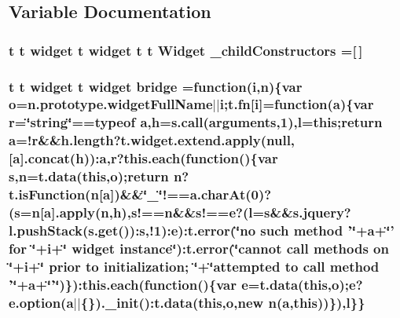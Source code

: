 \subsection{Variable Documentation}
\hypertarget{root_2static_2root_2js_2bootstrap_2jquery-ui-1_810_84_8custom_8min_8js_a82e9fe96f4c63a640d414c9ea1d4fc32}{
\subsubsection[{\-\_\-child\-Constructors}]{ {\bf t} {\bf t} {\bf widget} {\bf t} {\bf widget} {\bf t} {\bf t} {\bf Widget} \-\_\-child\-Constructors =\mbox{[}$\,$\mbox{]}}}\label{root_2static_2root_2js_2bootstrap_2jquery-ui-1_810_84_8custom_8min_8js_a82e9fe96f4c63a640d414c9ea1d4fc32}
\hypertarget{root_2static_2root_2js_2bootstrap_2jquery-ui-1_810_84_8custom_8min_8js_a937dfd5a26af72e715911d045dbd0f69}{
\subsubsection[{bridge}]{ {\bf t} {\bf t} {\bf widget} {\bf t} {\bf widget} bridge =function({\bf i},{\bf n})\{var {\bf o}=n.\-prototype.\-widget\-Full\-Name$\vert$$\vert${\bf i};{\bf t.\-fn}\mbox{[}{\bf i}\mbox{]}=function({\bf a})\{var {\bf r}=\char`\"{}string\char`\"{}==typeof {\bf a},{\bf h}={\bf s.\-call}(arguments,1),{\bf l}=this;return {\bf a}=!{\bf r}\&\&h.\-length?t.\-widget.\-extend.\-apply(null,\mbox{[}{\bf a}\mbox{]}.concat({\bf h}))\-:{\bf a},{\bf r}?{\bf this.\-each}(function()\{var {\bf s},{\bf n}={\bf t.\-data}(this,{\bf o});return {\bf n}?t.\-is\-Function({\bf n}\mbox{[}{\bf a}\mbox{]})\&\&\char`\"{}\-\_\-\char`\"{}!==a.\-char\-At(0)?({\bf s}={\bf n}\mbox{[}{\bf a}\mbox{]}.apply({\bf n},{\bf h}),s!=={\bf n}\&\&s!=={\bf e}?({\bf l}={\bf s}\&\&s.\-jquery?l.\-push\-Stack(s.\-get())\-:{\bf s},!1)\-:{\bf e})\-:{\bf t.\-error}(\char`\"{}no such method '\char`\"{}+a+\char`\"{}' for \char`\"{}+i+\char`\"{} widget instance\char`\"{})\-:t.\-error(\char`\"{}cannot {\bf call} methods {\bf on} \char`\"{}+i+\char`\"{} prior to initialization; \char`\"{}+\char`\"{}attempted to {\bf call} method '\char`\"{}+a+\char`\"{}'\char`\"{})\})\-:{\bf this.\-each}(function()\{var {\bf e}={\bf t.\-data}(this,{\bf o});{\bf e}?e.\-option({\bf a}$\vert$$\vert$\{\}).\-\_\-init()\-:{\bf t.\-data}(this,{\bf o},new {\bf n}({\bf a},this))\}),{\bf l}\}\}}}\label{root_2static_2root_2js_2bootstrap_2jquery-ui-1_810_84_8custom_8min_8js_a937dfd5a26af72e715911d045dbd0f69}
